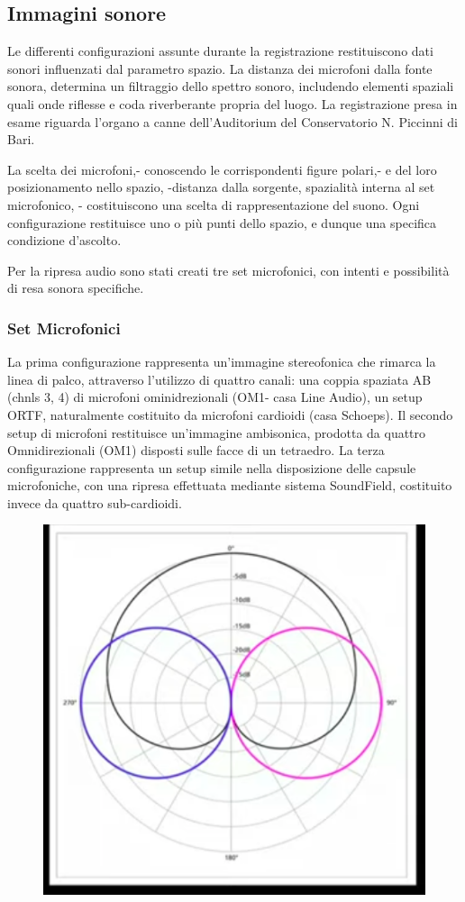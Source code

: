 \subsection*{Immagini sonore}
Le differenti configurazioni assunte durante la registrazione restituiscono 
dati sonori influenzati dal parametro spazio.
La distanza dei microfoni dalla fonte sonora, determina un filtraggio dello 
spettro sonoro, includendo elementi spaziali quali onde riflesse e coda 
riverberante propria del luogo.
La registrazione presa in esame riguarda l'organo a canne dell'Auditorium 
del Conservatorio N. Piccinni di Bari.

\begin{warn}
La scelta dei microfoni,- conoscendo le corrispondenti figure polari,- e del 
loro posizionamento nello spazio, -distanza dalla sorgente, spazialità interna 
al set microfonico, - costituiscono una scelta di rappresentazione del suono.
Ogni configurazione restituisce uno o più punti dello spazio, e dunque una 
specifica condizione d'ascolto.
\end{warn}

Per la ripresa audio sono stati creati tre set microfonici, con intenti e 
possibilità di resa sonora specifiche. 


\subsubsection*{Set Microfonici}
La prima configurazione rappresenta un'immagine stereofonica che 
rimarca la linea di palco, attraverso l'utilizzo di quattro canali:
una coppia spaziata AB (chnls 3, 4) di microfoni ominidrezionali 
(OM1- casa Line Audio), un setup ORTF, naturalmente costituito da 
microfoni cardioidi (casa Schoeps).
Il secondo setup di microfoni restituisce un'immagine ambisonica, prodotta 
da quattro Omnidirezionali (OM1) disposti sulle facce di un tetraedro.
La terza configurazione rappresenta un setup simile nella disposizione 
delle capsule microfoniche, con una ripresa effettuata mediante sistema 
SoundField, costituito invece da quattro sub-cardioidi.

\vfill\null

\begin{figure}[bh!]
\begin{center}
\includegraphics[width=.47\textwidth]{img/img7.png}
\label{gr01}
\end{center}
\end{figure}

